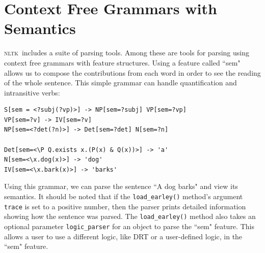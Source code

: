 \documentclass[11pt,a4paper]{article}
\newcommand{\NLTK}{\textsc{nltk}}
\newcommand{\dhgcode}[1]{{\tt #1}}
\begin{document}




\section{Context Free Grammars with Semantics}
\NLTK\ includes a suite of parsing tools.  Among these are tools for
parsing using context free grammars with feature structures.  Using a
feature called ``sem" allows us to compose the contributions from each
word in order to see the reading of the whole sentence.  This simple
grammar can handle quantification and intransitive verbs: 

\begin{verbatim}
S[sem = <?subj(?vp)>] -> NP[sem=?subj] VP[sem=?vp]
VP[sem=?v] -> IV[sem=?v]
NP[sem=<?det(?n)>] -> Det[sem=?det] N[sem=?n]

Det[sem=<\P Q.exists x.(P(x) & Q(x))>] -> 'a'
N[sem=<\x.dog(x)>] -> 'dog'
IV[sem=<\x.bark(x)>] -> 'barks'
\end{verbatim}

Using this grammar, we can parse the sentence ``A dog barks" and view
its semantics.  It should be noted that if the
\dhgcode{load\_earley()} method's argument \dhgcode{trace} is set to a
positive number, then the parser prints detailed information showing
how the sentence was parsed.  The \dhgcode{load\_earley()} method also
takes an optional parameter \dhgcode{logic\_parser} for an object to
parse the ``sem" feature.  This allows a user to use a different
logic, like DRT or a user-defined logic, in the ``sem" feature. 
\end{document}
